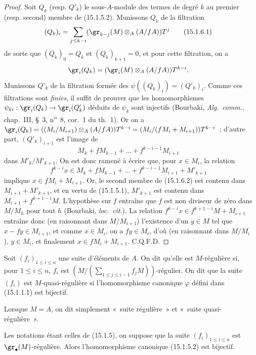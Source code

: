 \begin{proof}
Soit $Q_k$ (resp. $Q'_k$) le sous-$A$-module des termes de degré $k$ au
premier (resp. second) membre de (15.1.5.2). Munissons $Q_k$ de la filtration
\[
  (Q_k)_i=\sum_{j\leq k-i}
  (\gr_{k-j}(M)\otimes_A(A/fA))T^j
  \tag{15.1.6.1}\label{0.15.1.6.1-fr}
\]
de sorte que $(Q_k)_0=Q_k$ et $(Q_k)_{k+1}=0$, et pour cette filtration, on a
\[
  \gr_i(Q_k)=(\gr_i(M)\otimes_A(A/fA))T^{k-i}.
\]
Munissons $Q'_k$ de la filtration formée des
$\psi((Q_k)_i)=(Q'_k)_i$. Comme ces filtrations sont \emph{finies}, il suffit
de prouver que les homomorphismes
$\psi_{ki}:\gr_i(Q_k)\to\gr_i(Q'_k)$ déduits de $\psi_k$ sont injectifs
(Bourbaki, \emph{Alg.~comm.}, chap.~III, \S~3, n\textsuperscript{o}~8, cor.~1 du th.~1). Or on
a $\gr_i(Q_k)=((M_i/M_{i+1})\otimes_A(A/fA))T^{k-i}=(M_i/(fM_i+M_{i+1}))T^{k-i}$~;
d'autre part, $(Q'_k)_{i+1}$ est l'image de
\[
  M_k+fM_{k-1}+\ldots+f^{k-i-1}M_{i+1}
\]
dans $M'_k/M'_{k+1}$. On est donc ramené à écrire que, pour $x\in M_i$, la
relation
\[
  f^{k-i}x\in M_k+fM_{k-1}+\ldots+
  f^{k-i-1}M_{i+1}+M'_{k+1}
  \tag{15.1.6.2}\label{0.15.1.6.2-fr}
\]
implique $x\in fM_i+M_{i+1}$. Or, le second membre de (15.1.6.2) est contenu
dans $M_{i+1}+M'_{k+1}$, et en vertu de (15.1.5.1), $M'_{k+1}$ est contenu
dans $M_{i+1}+f^{k+1-i}M$. L'hypothèse sur $f$ entraîne que $f$ est non
diviseur de zéro dans $M/M_h$ pour tout $h$ (Bourbaki, \emph{loc.~cit.}). La
relation $f^{k-i}x\in f^{k+1-i}M+M_{i+1}$ entraîne donc (en raisonnant
dans $M/M_{i+1}$) l'existence d'un $y\in M$ tel que $x-fy\in M_{i+1}$, et comme
$x\in M_i$, on a $fy\in M_i$, d'où (en raisonnant dans $M/M_i$), $y\in M_i$,
et finalement $x\in fM_i+M_{i+1}$. C.Q.F.D.
\end{proof}

\begin{definition}[15.1.7]
\label{0.15.1.7-fr}
Soit $(f_i)_{1\leq i\leq n}$ une suite d'éléments de $A$. On dit qu'elle est
$M$-régulière si, pour $1\leq i\leq n$, $f_i$ est
$\left(M/(\sum_{1\leq j\leq i-1}f_jM)\right)$-régulier. On dit que la suite
$(f_i)$ est $M$-quasi-régulière si
l'homomorphisme canonique $\varphi$ défini dans (15.1.1.1) est bijectif.
\end{definition}

Lorsque $M=A$, on dit simplement «~suite régulière~» et
«~suite quasi-régulière~».

\begin{proposition}[15.1.8]
\label{0.15.1.8-fr}
Les notations étant celles de (15.1.5), on suppose que la suite
$(f_i)_{1\leq i\leq n}$ est $\gr_\bullet(M)$-régulière. Alors
l'homomorphisme canonique (15.1.5.2) est bijectif.
\end{proposition}

